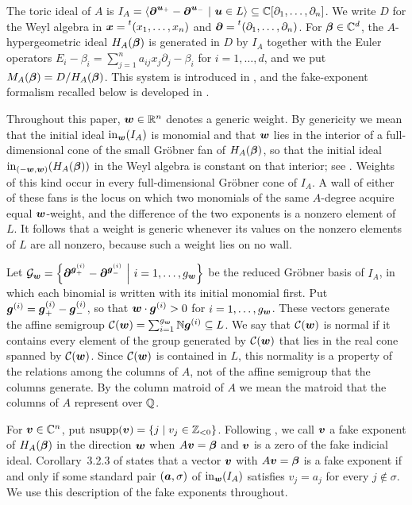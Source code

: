 The toric ideal of \(A\) is \(I_A= \left\langle \boldsymbol{\partial}^{\boldsymbol{u}_+} -\boldsymbol{\partial}^{\boldsymbol{u}_-} \ \middle|\ \boldsymbol{u}\in L \right\rangle \subseteq\mathbb C[\partial_1,\ldots,\partial_n]\).
We write \(D\) for the Weyl algebra in \(\boldsymbol{x}=\prescript{t}{}{(x_1,\ldots,x_n)}\) and \(\boldsymbol{\partial}=\prescript{t}{}{(\partial_1,\ldots,\partial_n)}\).
For \(\boldsymbol{\beta}\in\mathbb C^d\), the \(A\)-hypergeometric ideal \(H_A(\boldsymbol{\beta})\) is generated in \(D\) by \(I_A\) together with the Euler operators \(E_i-\beta_i =\sum_{j=1}^n a_{ij}x_j\partial_j-\beta_i\) for \(i=1,\ldots,d\), and we put \(M_A(\boldsymbol{\beta})=D/H_A(\boldsymbol{\beta})\).
This system is introduced in \cite{GKZ89,GKZ94}, and the fake-exponent formalism recalled below is developed in \cite{Sai02,SST00}.

Throughout this paper, \(\boldsymbol{w}\in\mathbb R^n\) denotes a generic weight.
By genericity we mean that the initial ideal \(\operatorname{in}_{\boldsymbol w}(I_A)\) is monomial and that \(\boldsymbol{w}\) lies in the interior of a full-dimensional cone of the small Gr\"obner fan of \(H_A(\boldsymbol{\beta})\), so that the initial ideal \(\operatorname{in}_{(-\boldsymbol{w},\boldsymbol{w})}(H_A(\boldsymbol{\beta}))\) in the Weyl algebra is constant on that interior; see \cite{SST00}.
Weights of this kind occur in every full-dimensional Gr\"obner cone of \(I_A\).
A wall of either of these fans is the locus on which two monomials of the same \(A\)-degree acquire equal \(\boldsymbol{w}\)-weight, and the difference of the two exponents is a nonzero element of \(L\).
It follows that a weight is generic whenever its values on the nonzero elements of \(L\) are all nonzero, because such a weight lies on no wall.

Let \(\cG_{\bw} = \left\{ \bpartial^{\bg^{(i)}_+} -\bpartial^{\bg^{(i)}_-} \ \middle|\ i=1,\ldots,g_{\bw} \right\}\) be the reduced Gr\"obner basis of \(I_A\), in which each binomial is written with its initial monomial first.
Put \(\boldsymbol{g}^{(i)}=\boldsymbol{g}^{(i)}_+-\boldsymbol{g}^{(i)}_-\), so that \(\boldsymbol{w}\cdot\boldsymbol{g}^{(i)}>0\) for \(i=1,\ldots,g_{\boldsymbol{w}}\).
These vectors generate the affine semigroup \(\mathcal C(\boldsymbol{w}) =\sum_{i=1}^{g_{\boldsymbol{w}}}\mathbb N\boldsymbol{g}^{(i)}\subseteq L\).
We say that \(\mathcal C(\boldsymbol{w})\) is normal if it contains every element of the group generated by \(\mathcal C(\boldsymbol{w})\) that lies in the real cone spanned by \(\mathcal C(\boldsymbol{w})\).
Since \(\mathcal C(\boldsymbol{w})\) is contained in \(L\), this normality is a property of the relations among the columns of \(A\), not of the affine semigroup that the columns generate.
By the column matroid of \(A\) we mean the matroid that the columns of \(A\) represent over \(\mathbb Q\).

For \(\boldsymbol{v}\in\mathbb C^n\), put \(\operatorname{nsupp}(\boldsymbol{v})=\{j\mid v_j\in\mathbb Z_{<0}\}\).
Following \cite[Section~3.2]{SST00}, we call \(\boldsymbol{v}\) a fake exponent of \(H_A(\boldsymbol{\beta})\) in the direction \(\boldsymbol{w}\) when \(A\boldsymbol{v}=\boldsymbol{\beta}\) and \(\boldsymbol{v}\) is a zero of the fake indicial ideal.
Corollary~3.2.3 of \cite{SST00} states that a vector \(\boldsymbol{v}\) with \(A\boldsymbol{v}=\boldsymbol{\beta}\) is a fake exponent if and only if some standard pair \((\boldsymbol{a},\sigma)\) of \(\operatorname{in}_{\boldsymbol w}(I_A)\) satisfies \(v_j=a_j\) for every \(j\notin\sigma\).
We use this description of the fake exponents throughout.

